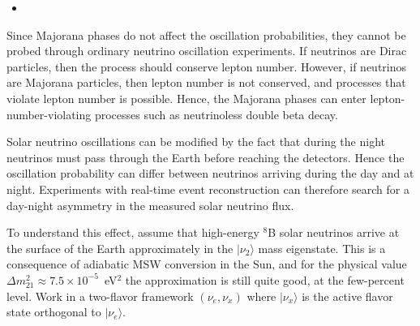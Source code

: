\begin{itemize}
    \item [(b)]
\end{itemize}
Since Majorana phases do not affect the oscillation probabilities, they cannot be probed through ordinary neutrino oscillation experiments. If neutrinos are Dirac particles, then the process should conserve lepton number. However, if neutrinos are Majorana particles, then lepton number is not conserved, and processes that violate lepton number is possible. Hence, the Majorana phases can enter lepton-number-violating processes such as neutrinoless double beta decay. 

\clearpage
{}

Solar neutrino oscillations can be modified by the fact that during the night neutrinos must pass through the Earth before reaching the detectors. Hence the oscillation probability can differ between neutrinos arriving during the day and at night. Experiments with real-time event reconstruction can therefore search for a day-night asymmetry in the measured solar neutrino flux.

To understand this effect, assume that high-energy $^8$B solar neutrinos arrive at the surface of the Earth approximately in the $|\nu_2\rangle$ mass eigenstate. This is a consequence of adiabatic MSW conversion in the Sun, and for the physical value $\Delta m_{21}^2\approx 7.5 \times 10^{-5}$~eV$^2$ the approximation is still quite good, at the few-percent level. Work in a two-flavor framework $(\nu_e,\nu_x)$ where $|\nu_x\rangle$ is the active flavor state orthogonal to $|\nu_e\rangle$.


